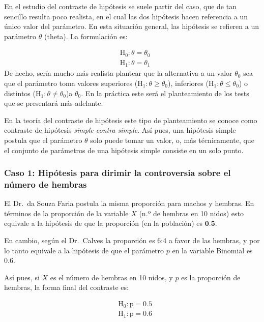 \documentclass[
]{article}
\begin{document}
En el estudio del contraste de hipótesis se suele partir del caso, que de tan sencillo resulta poco realista, en el cual las dos hipótesis hacen referencia a un único valor del parámetro. En esta situación general, las hipótesis se refieren a un parámetro \(\theta\) (theta). La formulación es:

\[
\begin{aligned}
& \mathrm{H}_{0}: \theta=\theta_{0} \\
& \mathrm{H}_{1}: \theta=\theta_{1}
\end{aligned}
\] De hecho, sería mucho más realista plantear que la alternativa a un valor \(\theta_0\) sea que el parámetro toma valores superiores (\(\mathrm{H}_{1}: \theta \geq \theta_{0}\)), inferiores (\(\mathrm{H}_{1}: \theta \leq \theta_{0}\)) o distintos (\(\mathrm{H}_{1}: \theta \neq \theta_{0}\))a \(\theta_0\). En la práctica este será el planteamiento de los tests que se presentará más adelante.

En la teoría del contraste de hipótesis este tipo de planteamiento se conoce como contraste de hipótesis \emph{simple contra simple}. Así pues, una hipótesis simple postula que el parámetro \(\theta\) solo puede tomar un valor, o, más técnicamente, que el conjunto de parámetros de una hipótesis simple consiste en un solo punto.

\subsubsection{Caso 1: Hipótesis para dirimir la controversia sobre el número de hembras}\label{caso-1-hipuxf3tesis-para-dirimir-la-controversia-sobre-el-nuxfamero-de-hembras}

El Dr.~da Souza Faria postula la misma proporción para machos y hembras. En términos de la proporción de la variable \(X\) (n.º de hembras en 10 nidos) esto equivale a la hipótesis de que la proporción (en la población) es \(\mathbf{0 . 5}\).

En cambio, según el Dr.~Calves la proporción es 6:4 a favor de las hembras, y por lo tanto equivale a la hipótesis de que el parámetro \(p\) en la variable Binomial es 0.6.

Así pues, si \(X\) es el número de hembras en 10 nidos, y \(p\) es la proporción de hembras, la forma final del contraste es:

\[
\begin{aligned}
& \mathrm{H}_{0}: \mathrm{p}=0.5 \\
& \mathrm{H}_{1}: \mathrm{p}=0.6
\end{aligned}
\]
\end{document}
